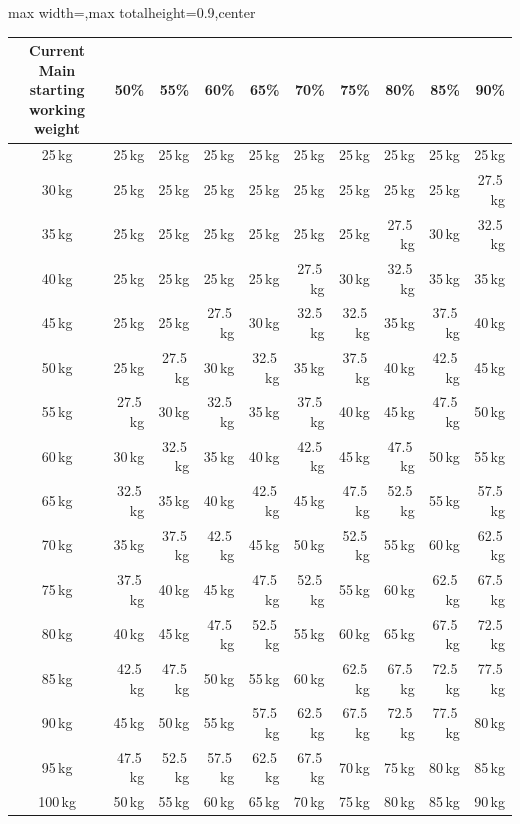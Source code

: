 \documentclass[11pt,a4paper]{article}
\newcommand{\tablearraystretch}{1.15}
\begin{document}
\begin{center}
\renewcommand{\arraystretch}{\tablearraystretch}
\begin{adjustbox}{max width=\linewidth,max totalheight=0.9\textheight,center}
\begin{tabular}{crrrrrrrrr}
\toprule
Current Main starting working weight & 50\% & 55\% & 60\% & 65\% & 70\% & 75\% & 80\% & 85\% & 90\% \\
\midrule
25\,kg   & 25\,kg & 25\,kg & 25\,kg & 25\,kg & 25\,kg & 25\,kg & 25\,kg & 25\,kg & 25\,kg \\
30\,kg   & 25\,kg & 25\,kg & 25\,kg & 25\,kg & 25\,kg & 25\,kg & 25\,kg & 25\,kg & 27.5\,kg \\
35\,kg   & 25\,kg & 25\,kg & 25\,kg & 25\,kg & 25\,kg & 25\,kg & 27.5\,kg & 30\,kg & 32.5\,kg \\
40\,kg   & 25\,kg & 25\,kg & 25\,kg & 25\,kg & 27.5\,kg & 30\,kg & 32.5\,kg & 35\,kg & 35\,kg \\
45\,kg   & 25\,kg & 25\,kg & 27.5\,kg & 30\,kg & 32.5\,kg & 32.5\,kg & 35\,kg & 37.5\,kg & 40\,kg \\
50\,kg   & 25\,kg & 27.5\,kg & 30\,kg & 32.5\,kg & 35\,kg & 37.5\,kg & 40\,kg & 42.5\,kg & 45\,kg \\
55\,kg   & 27.5\,kg & 30\,kg & 32.5\,kg & 35\,kg & 37.5\,kg & 40\,kg & 45\,kg & 47.5\,kg & 50\,kg \\
60\,kg   & 30\,kg & 32.5\,kg & 35\,kg & 40\,kg & 42.5\,kg & 45\,kg & 47.5\,kg & 50\,kg & 55\,kg \\
65\,kg   & 32.5\,kg & 35\,kg & 40\,kg & 42.5\,kg & 45\,kg & 47.5\,kg & 52.5\,kg & 55\,kg & 57.5\,kg \\
70\,kg   & 35\,kg & 37.5\,kg & 42.5\,kg & 45\,kg & 50\,kg & 52.5\,kg & 55\,kg & 60\,kg & 62.5\,kg \\
75\,kg   & 37.5\,kg & 40\,kg & 45\,kg & 47.5\,kg & 52.5\,kg & 55\,kg & 60\,kg & 62.5\,kg & 67.5\,kg \\
80\,kg   & 40\,kg & 45\,kg & 47.5\,kg & 52.5\,kg & 55\,kg & 60\,kg & 65\,kg & 67.5\,kg & 72.5\,kg \\
85\,kg   & 42.5\,kg & 47.5\,kg & 50\,kg & 55\,kg & 60\,kg & 62.5\,kg & 67.5\,kg & 72.5\,kg & 77.5\,kg \\
90\,kg   & 45\,kg & 50\,kg & 55\,kg & 57.5\,kg & 62.5\,kg & 67.5\,kg & 72.5\,kg & 77.5\,kg & 80\,kg \\
95\,kg   & 47.5\,kg & 52.5\,kg & 57.5\,kg & 62.5\,kg & 67.5\,kg & 70\,kg & 75\,kg & 80\,kg & 85\,kg \\
100\,kg  & 50\,kg & 55\,kg & 60\,kg & 65\,kg & 70\,kg & 75\,kg & 80\,kg & 85\,kg & 90\,kg \\

\end{tabular}
\end{adjustbox}
\end{center}
\end{document}
